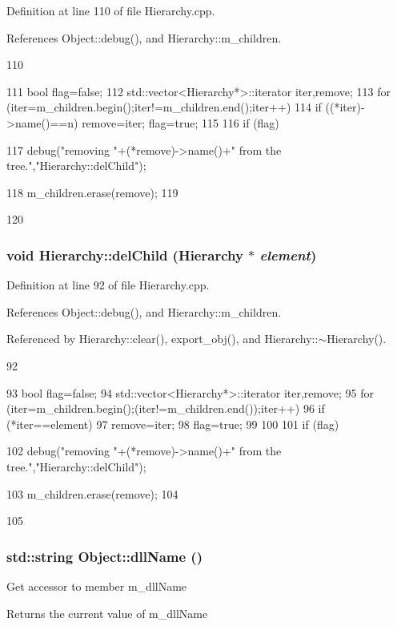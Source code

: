 Definition at line 110 of file Hierarchy.cpp.

References Object::debug(), and Hierarchy::m\_\-children.


\begin{DoxyCode}
110                                    {
111   bool flag=false;
112   std::vector<Hierarchy*>::iterator iter,remove;
113   for (iter=m_children.begin();iter!=m_children.end();iter++){
114     if ((*iter)->name()==n){ remove=iter; flag=true;}
115   }
116   if (flag){
117     debug("removing "+(*remove)->name()+" from the tree.","Hierarchy::delChild");
      
118     m_children.erase(remove);
119   }
120 }
\end{DoxyCode}
\hypertarget{classHierarchy_a2b2b359fac003233f65786a616766bde}{
\subsubsection[{delChild}]{\setlength{\rightskip}{0pt plus 5cm}void Hierarchy::delChild ({\bf Hierarchy} $\ast$ {\em element})}}
\label{classHierarchy_a2b2b359fac003233f65786a616766bde}


Definition at line 92 of file Hierarchy.cpp.

References Object::debug(), and Hierarchy::m\_\-children.

Referenced by Hierarchy::clear(), export\_\-obj(), and Hierarchy::$\sim$Hierarchy().


\begin{DoxyCode}
92                                           {
93   bool flag=false;
94   std::vector<Hierarchy*>::iterator iter,remove;
95   for (iter=m_children.begin();(iter!=m_children.end());iter++){
96     if (*iter==element){
97       remove=iter;
98       flag=true;
99     }
100   }
101   if (flag){
102     debug("removing "+(*remove)->name()+" from the tree.","Hierarchy::delChild");
      
103     m_children.erase(remove);
104   }
105 }
\end{DoxyCode}
\hypertarget{classObject_a2e3947f2870094c332d7454117f3ec63}{
\subsubsection[{dllName}]{\setlength{\rightskip}{0pt plus 5cm}std::string Object::dllName ()}}
\label{classObject_a2e3947f2870094c332d7454117f3ec63}
Get accessor to member m\_\-dllName \begin{DoxyReturn}{Returns}
the current value of m\_\-dllName 
\end{DoxyReturn}


